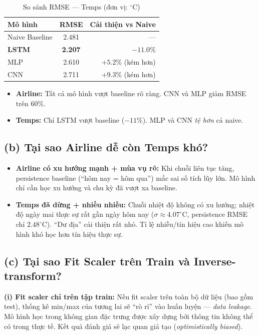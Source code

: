 \documentclass[12pt,a4paper]{article}
\begin{document}
\begin{table}[H]
\centering
\caption{So sánh RMSE --- Temps (đơn vị: $^\circ$C)}
\begin{tabular}{lcr}
\toprule
\textbf{Mô hình} & \textbf{RMSE} & \textbf{Cải thiện vs Naive} \\
\midrule
Naive Baseline & 2.481 & ---       \\
\textbf{LSTM}  & \textbf{2.207} & $\mathbf{-11.0\%}$ \\
MLP            & 2.610 & $+5.2\%$ (kém hơn) \\
CNN            & 2.711 & $+9.3\%$ (kém hơn) \\
\bottomrule
\end{tabular}
\end{table}

\begin{itemize}
    \item \textbf{Airline:} Tất cả mô hình vượt baseline rõ ràng. CNN và MLP giảm RMSE trên $60\%$.
    \item \textbf{Temps:} Chỉ LSTM vượt baseline ($-11\%$). MLP và CNN \textit{tệ hơn} cả naive.
\end{itemize}

\subsection{(b) Tại sao Airline dễ còn Temps khó?}

\begin{itemize}
    \item \textbf{Airline có xu hướng mạnh + mùa vụ rõ:} Khi chuỗi liên tục tăng, persistence baseline (``hôm nay = hôm qua'') mắc sai số tích lũy lớn. Mô hình chỉ cần học xu hướng và chu kỳ đã vượt xa baseline.
    \item \textbf{Temps đã dừng + nhiều nhiễu:} Chuỗi nhiệt độ không có xu hướng; nhiệt độ ngày mai thực sự rất gần ngày hôm nay ($\sigma \approx 4.07^\circ$C, persistence RMSE chỉ $2.48^\circ$C). ``Dư địa'' cải thiện rất nhỏ. Tỉ lệ nhiễu/tín hiệu cao khiến mô hình khó học hơn tín hiệu thực sự.
\end{itemize}

\subsection{(c) Tại sao Fit Scaler trên Train và Inverse-transform?}

\textbf{(i) Fit scaler chỉ trên tập train:}
Nếu fit scaler trên toàn bộ dữ liệu (bao gồm test), thống kê min/max của tương lai sẽ ``rò rỉ'' vào huấn luyện --- \textit{data leakage}. Mô hình học trong không gian đặc trưng được xây dựng bởi thông tin không thể có trong thực tế. Kết quả đánh giá sẽ lạc quan giả tạo (\textit{optimistically biased}).
\end{document}
